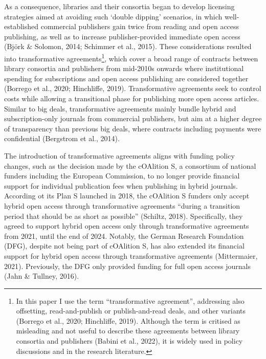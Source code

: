 \documentclass[a4paper,man,floatsintext,longtable,noextraspace,12pt]{apa6}
\begin{document}
As a consequence, libraries and their consortia began to develop
licensing strategies aimed at avoiding such `double dipping' scenarios,
in which well-established commercial publishers gain twice from reading
and open access publishing, as well as to increase publisher-provided
immediate open access (Björk \& Solomon, 2014; Schimmer et al., 2015).
These considerations resulted into transformative agreements\footnote{In
  this paper I use the term ``transformative agreement'', addressing
  also offsetting, read-and-publish or publish-and-read deals, and other
  variants (Borrego et al., 2020; Hinchliffe, 2019). Although the term
  is critised as misleading and not useful to describe these agreements
  between library consortia and publishers (Babini et al., 2022), it is
  widely used in policy discussions and in the research literature.},
which cover a broad range of contracts between library consortia and
publishers from mid-2010s onwards where institutional spending for
subscriptions and open access publishing are considered together
(Borrego et al., 2020; Hinchliffe, 2019). Transformative agreements seek
to control costs while allowing a transitional phase for publishing more
open access articles. Similar to big deals, transformative agreements
mainly bundle hybrid and subscription-only journals from commercial
publishers, but aim at a higher degree of transparency than previous big
deals, where contracts including payments were confidential (Bergstrom
et al., 2014).

The introduction of transformative agreements aligns with funding policy
changes, such as the decision made by the cOAlition S, a consortium of
national funders including the European Commission, to no longer provide
financial support for individual publication fees when publishing in
hybrid journals. According ot its Plan S launched in 2018, the cOAlition
S funders only accept hybrid open access through transformative
agreements ``during a transition period that should be as short as
possible'' (Schiltz, 2018). Specifically, they agreed to support hybrid
open access only through transformative agreements from 2021, until the
end of 2024. Notably, the German Research Foundation (DFG), despite not
being part of cOAlition S, has also extended its financial support for
hybrid open access through transformative agreements (Mittermaier,
2021). Previously, the DFG only provided funding for full open access
journals (Jahn \& Tullney, 2016).
\end{document}
